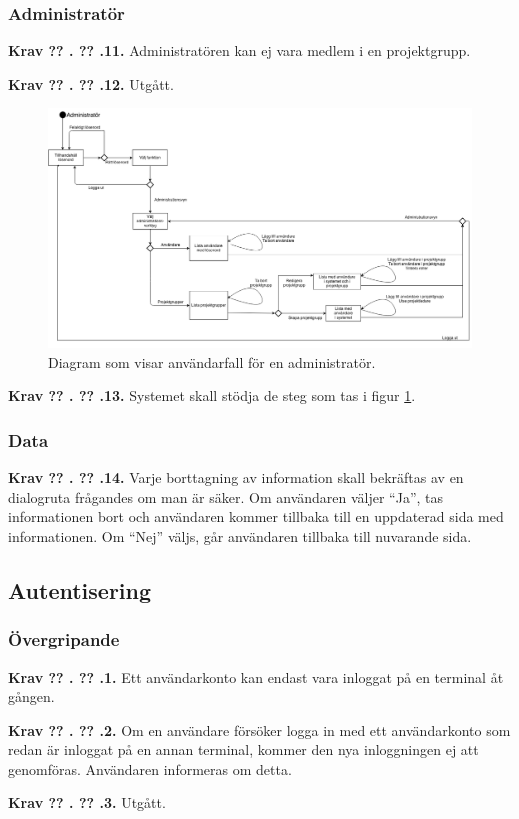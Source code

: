 \documentclass[a4paper]{article}
\newcommand\getcurrentref[1]{%
 \ifnumequal{\value{#1}}{0}
  {??}
  {\the\value{#1}}%
}
\newcommand\requirement[2]{
	\numberedrow{Krav}{#1}{#2}
}
\newcommand\numberedrow[3]{
	\noindent
	\textbf{#1 \getcurrentref{section}.\getcurrentref{subsection}.#2.} #3
	
}
\begin{document}
		\subsubsection*{Administratör}
		\requirement{11}{Administratören kan ej vara medlem i en projektgrupp. }
		\requirement{12}{Utgått.}
			\begin{figure}[H]
				\centering
				\includegraphics[width=\textwidth]{flow_common_admin}
				\caption{Diagram som visar användarfall för en administratör.}
				\label{image_gen_admin}
			\end{figure}
		\requirement{13}{Systemet skall stödja de steg som tas i figur \ref{image_gen_admin}.}
		\subsubsection*{Data}
		\requirement{14}{Varje borttagning av information skall bekräftas av en dialogruta frågandes om man är säker. Om användaren väljer ``Ja'', tas informationen bort och användaren kommer tillbaka till en uppdaterad sida med informationen. Om ``Nej'' väljs, går användaren tillbaka till nuvarande sida.}
		
		


	\subsection{Autentisering}
		\label{krav-funk-aut}
		\subsubsection*{Övergripande}
			\requirement{1}{Ett användarkonto kan endast vara inloggat på en terminal åt gången.}			
			\requirement{2}{Om en användare försöker logga in med ett användarkonto som redan är inloggat på en annan terminal, kommer den nya inloggningen ej att genomföras. Användaren informeras om detta.}
			\requirement{3}{Utgått.}
\end{document}
